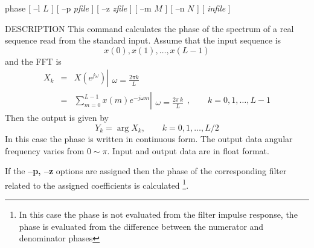 
\begin{synopsis}
\item[phase] [ --l $L$ ] [ --p {\em pfile} ] [ --z {\em zfile} ]
             [ --m $M$ ] [ --n $N$ ] [ {\em infile} ]
\end{synopsis}

\begin{qsection}{DESCRIPTION}
This command calculates the phase of the spectrum of a real sequence read
from the standard input.
Assume that the input sequence is
\begin{displaymath}
  x(0), x(1), \ldots, x(L-1)
\end{displaymath}
and the FFT is
\begin{eqnarray*}
  X_k &=& X(e^{j\omega}) \left|
	\begin{array}{c}
	\\
        \omega=\frac{2\pi k}{L}
	\end{array}
    \right. \nonumber \\
         &=& \sum_{m=0}^{L-1}x(m)e^{-j\omega m} \left|
	\begin{array}{c}
	\\
        \omega=\frac{2\pi\, k}{L}
	\end{array}
    \right.,\qquad k=0,1,\ldots,L-1
\end{eqnarray*}
Then the output is given by
\begin{displaymath}
  Y_k=\arg X_k, \qquad k=0,1,\ldots,L/2
\end{displaymath}
In this case the phase is written in continuous form.
The output data angular frequency varies from $0\sim \pi$.
Input and output data are in float format.
\par
If the {\bf --p, --z} options are assigned
then the phase of the corresponding filter related to
the assigned coefficients is calculated
\footnote{
In this case the phase is not evaluated from the filter
impulse response, the phase is evaluated from
the difference between the numerator and denominator phases}.
\end{qsection}

